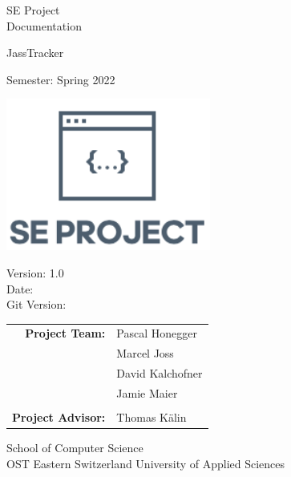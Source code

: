 \begin{titlepage}

    \begin{center}

        \vspace{1 cm}

        {\Large SE Project \\ Documentation} \\

        \vspace{0.5cm}

        {\Huge JassTracker}

        \vspace{0.5cm}

        Semester: Spring 2022

        \vspace{1 cm}

        \includegraphics[height=5cm]{resources/se-project-logo.png}

        \vspace{1 cm}

        Version: 1.0 \\
        Date: \DTMnow \\
        Git Version: \gitDescription
        \vspace{1 cm}

        \begin{tabular}{rl}
            \textbf{Project Team:}    & Pascal Honegger \\
                                      & Marcel Joss \\
                                      & David Kalchofner \\
                                      & Jamie Maier \\
                                      &                    \\
            \textbf{Project Advisor:} & Thomas Kälin
        \end{tabular}

        \vfill


        \vspace{1cm}
        School of Computer Science\\
        OST Eastern Switzerland University of Applied Sciences

    \end{center}

\end{titlepage}
